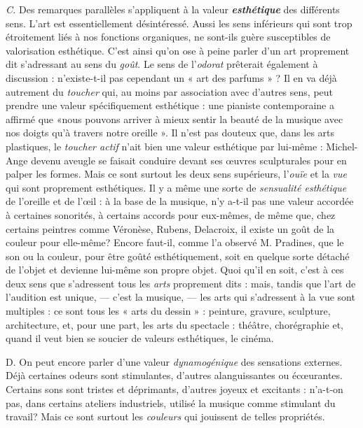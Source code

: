 {\it C.} Des remarques parallèles s’appliquent à la valeur \textbf{\textit {esthétique}}
des différents sens. L'art est essentiellement désintéressé. Aussi les
sens inférieurs qui sont trop étroitement liés à nos fonctions organiques,
ne sont-ils guère susceptibles de valorisation esthétique. C’est
ainsi qu’on ose à peine parler d’un art proprement dit s’adressant au
sens du {\it goût}. Le sens de l’{\it odorat} prêterait également à discussion :
n’existe-t-il pas cependant un « art des parfums » ? Il en va déjà
autrement du {\it toucher} qui, au moins par association avec d’autres
sens, peut prendre une valeur spécifiquement esthétique : une pianiste
contemporaine a affirmé que «nous pouvons arriver à mieux sentir
la beauté de la musique avec nos doigts qu’à travers notre oreille ».
Il n’est pas douteux que, dans les arts plastiques, le {\it toucher actif} n’ait
bien une valeur esthétique par lui-même : Michel-Ange devenu aveugle
se faisait conduire devant ses œuvres sculpturales pour en palper les
formes. Mais ce sont surtout les deux sens supérieurs, l’{\it ouïe} et la
{\it vue} qui sont proprement esthétiques. Il y a même une sorte de
{\it sensualité esthétique} de l’oreille et de l’œil : à la base de la musique, n’y
a-t-il pas une valeur accordée à certaines sonorités, à certains accords
pour eux-mêmes, de même que, chez certains peintres comme Véronèse,
Rubens, Delacroix, il existe un goût de la couleur pour elle-même?
Encore faut-il, comme l’a observé M. Pradines, que le son ou la
couleur, pour être goûté esthétiquement, soit en quelque sorte
détaché de l’objet et devienne lui-même son propre objet. Quoi qu’il
en soit, c’est à ces deux sens que s'adressent tous les {\it arts} proprement
dits : mais, tandis que l’art de l’audition est unique, — c’est la
musique, — les arts qui s’adressent à la vue sont multiples : ce sont
tous les « arts du dessin » : peinture, gravure, sculpture, architecture,
et, pour une part, les arts du spectacle : théâtre, chorégraphie
et, quand il veut bien se soucier de valeurs esthétiques, le
cinéma.

{\it }D. On peut encore parler d’une valeur {\it dynamogénique} des sensations
externes. Déjà certaines odeurs sont stimulantes, d’autres alanguissantes
ou écœurantes. Certains sons sont tristes et déprimants,
d’autres joyeux et excitants : n’a-t-on pas, dans certains ateliers
industriels, utilisé la musique comme stimulant du travail? Mais ce
sont surtout les {\it couleurs} qui jouissent de telles propriétés.

